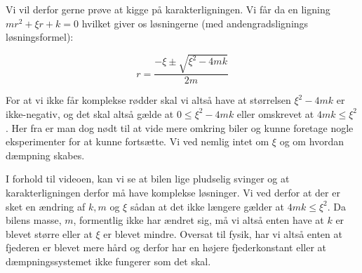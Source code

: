 Vi vil derfor gerne prøve at kigge på karakterligningen. 
Vi får da en ligning $mr^2 + \xi r + k = 0$ hvilket giver os løsningerne (med andengradslignings løsningsformel):

\begin{equation}
r = \dfrac{-\xi \pm \sqrt{\xi ^2 - 4mk}}{2m}
\end{equation}


For at vi ikke får komplekse rødder skal vi altså have at størrelsen $\xi ^2 -4mk$ er ikke-negativ, og det skal altså gælde at $0 \leq \xi ^2 -4mk $ eller omskrevet at $4mk \leq \xi ^2 $.
Her fra er man dog nødt til at vide mere omkring biler og kunne foretage nogle eksperimenter for at kunne fortsætte. 
Vi ved nemlig intet om $\xi$ og om hvordan dæmpning skabes. 

I forhold til videoen, kan vi se at bilen lige pludselig svinger og at karakterligningen derfor må have komplekse løsninger.
Vi ved derfor at der er sket en ændring af $k,m$ og $\xi$ sådan at det ikke længere gælder at $4mk \leq \xi ^2 $.
Da bilens masse, $m$, formentlig ikke har ændret sig, må vi altså enten have at $k$ er blevet større eller at $\xi$ er blevet mindre. 
Oversat til fysik, har vi altså enten at fjederen er blevet mere hård og derfor har en højere fjederkonstant eller at dæmpningssystemet ikke fungerer som det skal.  

